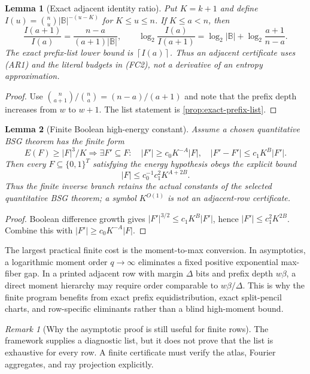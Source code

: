 \documentclass[12pt,a4paper]{amsart}
\numberwithin{equation}{section}
\newtheorem{lemma}[lemma]{Lemma}
\theoremstyle{remark}
\newtheorem{remark}[remark]{Remark}
\newcommand{\B}{\mathbb B}
\newcommand{\abs}[1]{\lvert #1\rvert}
\newcommand{\ceil}[1]{\left\lceil #1\right\rceil}
\begin{document}
\begin{lemma}[Exact adjacent identity ratio]
\label{lem:exact-adjacent-identity-ratio}
Put \(K=k+1\) and define
\(I(u)=\binom nu\abs\B^{-(u-K)}\) for \(K\le u\le n\).  If
\(K\le a<n\), then
\[
 \frac{I(a+1)}{I(a)}=
 \frac{n-a}{(a+1)\abs\B},
 \qquad
 \log_2\frac{I(a)}{I(a+1)}
 =\log_2\abs\B+\log_2\frac{a+1}{n-a}.              \tag{AR1}
\]
The exact prefix-list lower bound is \(\ceil{I(a)}\).  Thus an adjacent
certificate uses \textup{(AR1)} and the literal budgets in
\textup{(FC2)}, not a derivative of an entropy approximation.
\end{lemma}

\begin{proof}
Use \(\binom n{a+1}/\binom na=(n-a)/(a+1)\) and note that the prefix
depth increases from \(w\) to \(w+1\).  The list statement is
\cref{prop:exact-prefix-list}.
\end{proof}

\begin{lemma}[Finite Boolean high-energy constant]
\label{lem:finite-boolean-high-energy}
Assume a chosen quantitative BSG theorem has the finite form
\[
 E(F)\ge\abs F^3/K
 \Longrightarrow
 \exists F'\subseteq F:\quad
 \abs{F'}\ge c_0K^{-A}\abs F,
 \quad
 \abs{F'-F'}\le c_1K^B\abs{F'}.
\]
Then every \(F\subseteq\{0,1\}^T\) satisfying the energy hypothesis obeys
the explicit bound
\[
                 \abs F\le c_0^{-1}c_1^2K^{A+2B}.   \tag{FC3}
\]
Thus the finite inverse branch retains the actual constants of the selected
quantitative BSG theorem; a symbol \(K^{O(1)}\) is not an adjacent-row
certificate.
\end{lemma}

\begin{proof}
Boolean difference growth gives
\(\abs{F'}^{3/2}\le c_1K^B\abs{F'}\), hence
\(\abs{F'}\le c_1^2K^{2B}\).  Combine this with
\(\abs{F'}\ge c_0K^{-A}\abs F\).
\end{proof}

The largest practical finite cost is the moment-to-max conversion.  In asymptotics, a logarithmic moment order \(q\to\infty\) eliminates a fixed positive exponential max-fiber gap.  In a printed adjacent row with margin \(\Delta\) bits and prefix depth \(w\beta\), a direct moment hierarchy may require order comparable to \(w\beta/\Delta\).  This is why the finite program benefits from exact prefix equidistribution, exact split-pencil charts, and row-specific eliminants rather than a blind high-moment bound.

\begin{remark}[Why the asymptotic proof is still useful for finite rows]
The framework supplies a diagnostic list, but it does not prove that the
list is exhaustive for every row.  A finite certificate must verify the
atlas, Fourier aggregates, and ray projection explicitly.
\end{remark}
\end{document}
